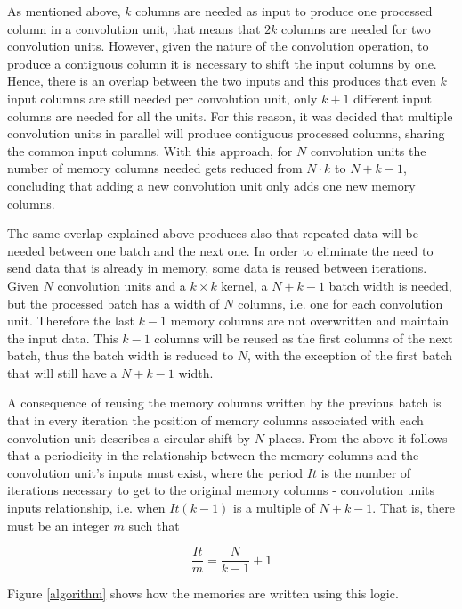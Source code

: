 \documentclass[conference,compsoc]{IEEEtran}
\begin{document}
As mentioned above, $k$ columns are needed as input to produce one processed
column in a convolution unit, that means that $2k$ columns are needed for two
convolution units. However, given the nature of the convolution operation, to
produce a contiguous column it is necessary to shift the input columns by one.
Hence, there is an overlap between the two inputs and this produces that even $k$ input columns are still needed per convolution unit, only
$k+1$ different input columns are needed for all the units. For this reason, it was decided that
multiple convolution units in parallel will produce contiguous processed
columns, sharing the common input columns. With this approach, for $N$
convolution units the number of memory columns needed gets reduced from $N\cdot
k$ to $N+k-1$, concluding that adding a new convolution unit only adds one new
memory columns.

The same overlap explained above produces also that repeated data will be needed
between one batch and the next one. In order to eliminate the need to send data
that is already in memory, some data is reused between iterations. Given $N$ convolution
units and a $k\times k$ kernel, a $N+k-1$ batch width is needed, but the
processed batch has a width of $N$ columns, i.e. one for each convolution unit. 
Therefore the last $k-1$ memory columns are not overwritten and maintain the
input data. This $k-1$ columns will be reused as the first columns of the 
next batch, thus the batch width is reduced to $N$, with the exception of
the first batch that will still have a $N+k-1$ width.

A consequence of reusing the memory columns written by the previous batch is
that in every iteration the position of memory columns associated with each
convolution unit describes a circular shift by $N$ places. From the above it
follows that a periodicity in the relationship between the memory columns and the
convolution unit's inputs must exist, where the period $It$ is the number of
iterations necessary to get to the original memory columns - convolution units
inputs relationship, i.e. when $It(k-1)$ is a multiple of $N+k-1$. That is, there
must be an integer $m$ such that 

\begin{equation}\label{niter}
  \frac{It}{m} = \frac{N}{k-1} + 1
\end{equation}


Figure \ref{algorithm} shows how the memories are written using this logic.
\end{document}
